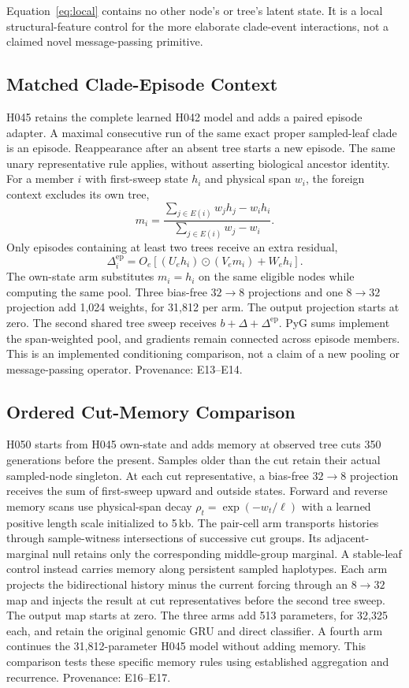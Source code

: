 \documentclass[letterpaper]{article}
\begin{document}
Equation~\ref{eq:local} contains no other node's or tree's latent state. It is a local structural-feature control for the more elaborate clade-event interactions, not a claimed novel message-passing primitive.

\subsection{Matched Clade-Episode Context}
\label{sec:episodes}
H045 retains the complete learned H042 model and adds a paired episode adapter. A maximal consecutive run of the same exact proper sampled-leaf clade is an episode. Reappearance after an absent tree starts a new episode. The same unary representative rule applies, without asserting biological ancestor identity. For a member $i$ with first-sweep state $h_i$ and physical span $w_i$, the foreign context excludes its own tree,
\begin{equation}
m_i=\frac{\sum_{j\in E(i)}w_jh_j-w_ih_i}
           {\sum_{j\in E(i)}w_j-w_i}.
\end{equation}
Only episodes containing at least two trees receive an extra residual,
\begin{equation}
\Delta_i^{\mathrm{ep}}=
O_e\!\left[(U_eh_i)\odot(V_em_i)+W_eh_i\right].
\end{equation}
The own-state arm substitutes $m_i=h_i$ on the same eligible nodes while computing the same pool. Three bias-free $32\to8$ projections and one $8\to32$ projection add 1,024 weights, for 31,812 per arm. The output projection starts at zero. The second shared tree sweep receives $b+\Delta+\Delta^{\mathrm{ep}}$. PyG sums implement the span-weighted pool, and gradients remain connected across episode members. This is an implemented conditioning comparison, not a claim of a new pooling or message-passing operator. Provenance: E13--E14.

\subsection{Ordered Cut-Memory Comparison}
H050 starts from H045 own-state and adds memory at observed tree cuts 350 generations before the present. Samples older than the cut retain their actual sampled-node singleton. At each cut representative, a bias-free $32\to8$ projection receives the sum of first-sweep upward and outside states. Forward and reverse memory scans use physical-span decay $\rho_t=\exp(-w_t/\ell)$ with a learned positive length scale initialized to 5\,kb. The pair-cell arm transports histories through sample-witness intersections of successive cut groups. Its adjacent-marginal null retains only the corresponding middle-group marginal. A stable-leaf control instead carries memory along persistent sampled haplotypes. Each arm projects the bidirectional history minus the current forcing through an $8\to32$ map and injects the result at cut representatives before the second tree sweep. The output map starts at zero. The three arms add 513 parameters, for 32,325 each, and retain the original genomic GRU and direct classifier. A fourth arm continues the 31,812-parameter H045 model without adding memory. This comparison tests these specific memory rules using established aggregation and recurrence. Provenance: E16--E17.
\end{document}
